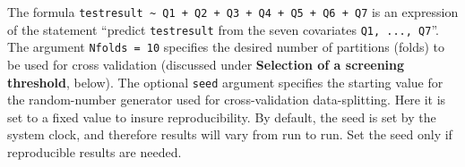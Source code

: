 \documentclass[11pt]{report}\usepackage[]{graphicx}\usepackage[]{xcolor}
\makeatletter
\newenvironment{kframe}{%
 \def\at@end@of@kframe{}%
 \ifinner\ifhmode%
  \def\at@end@of@kframe{\end{minipage}}%
  \begin{minipage}{\columnwidth}%
 \fi\fi%
 \def\FrameCommand##1{\hskip\@totalleftmargin \hskip-\fboxsep
 \colorbox{shadecolor}{##1}\hskip-\fboxsep
     \hskip-\linewidth \hskip-\@totalleftmargin \hskip\columnwidth}%
 \MakeFramed {\advance\hsize-\width
   \@totalleftmargin\z@ \linewidth\hsize
   \@setminipage}}%
 {\par\unskip\endMakeFramed%
 \at@end@of@kframe}
\newenvironment{knitrout}{}{} %
\makeatother
\begin{document}
\begin{knitrout}
\begin{kframe}
{\ttfamily\noindent\itshape\color{messagecolor}{\#\# Setting levels: control = 0, case = 1}}

{\ttfamily\noindent\itshape\color{messagecolor}{\#\# Setting direction: controls < cases}}

{\ttfamily\noindent\itshape\color{messagecolor}{\#\# Setting levels: control = 0, case = 1}}

{\ttfamily\noindent\itshape\color{messagecolor}{\#\# Setting direction: controls < cases}}

{\ttfamily\noindent\itshape\color{messagecolor}{\#\# Setting levels: control = 0, case = 1}}

{\ttfamily\noindent\itshape\color{messagecolor}{\#\# Setting direction: controls < cases}}

{\ttfamily\noindent\itshape\color{messagecolor}{\#\# Done.}}

{\ttfamily\noindent\itshape\color{messagecolor}{\#\# \\\#\# Performing 10-fold cross-validation...}}

{\ttfamily\noindent\itshape\color{messagecolor}{\#\# Done.}}

{\ttfamily\noindent\itshape\color{messagecolor}{\#\# \\\#\# Computing cross-validated ROCs...}}

{\ttfamily\noindent\itshape\color{messagecolor}{\#\# Setting levels: control = 0, case = 1}}

{\ttfamily\noindent\itshape\color{messagecolor}{\#\# Setting direction: controls < cases}}

{\ttfamily\noindent\itshape\color{messagecolor}{\#\# Setting levels: control = 0, case = 1}}

{\ttfamily\noindent\itshape\color{messagecolor}{\#\# Setting direction: controls < cases}}

{\ttfamily\noindent\itshape\color{messagecolor}{\#\# Done.}}\end{kframe}
\end{knitrout}

The formula \verb|testresult ~ Q1 + Q2 + Q3 + Q4 + Q5 + Q6 + Q7| is an
expression of the statement ``predict \verb|testresult| from the seven
covariates \verb|Q1, ..., Q7|''. The argument \verb|Nfolds = 10|
specifies the desired number of partitions (folds) to be used for
cross validation (discussed under \textbf{Selection of a screening
threshold}, below).  The optional \verb|seed| argument specifies the starting value
for the random-number generator used for cross-validation data-splitting. Here
it is set to a fixed value to insure reproducibility. By default, the
seed is set by the system clock, and therefore results will vary from
run to run. Set the seed only if reproducible results are needed.
\end{document}
